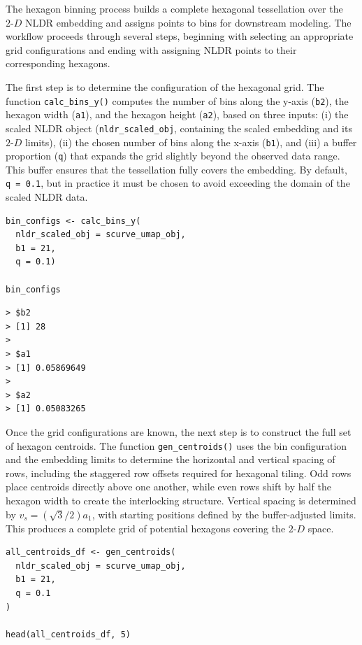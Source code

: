 The hexagon binning process builds a complete hexagonal tessellation over the \(2\text{-}D\) NLDR embedding and assigns points to bins for downstream modeling. The workflow proceeds through several steps, beginning with selecting an appropriate grid configurations and ending with assigning NLDR points to their corresponding hexagons.

The first step is to determine the configuration of the hexagonal grid. The function \texttt{calc\_bins\_y()} computes the number of bins along the y-axis (\texttt{b2}), the hexagon width (\texttt{a1}), and the hexagon height (\texttt{a2}), based on three inputs: (i) the scaled NLDR object (\texttt{nldr\_scaled\_obj}, containing the scaled embedding and its \(2\text{-}D\) limits), (ii) the chosen number of bins along the x-axis (\texttt{b1}), and (iii) a buffer proportion (\texttt{q}) that expands the grid slightly beyond the observed data range. This buffer ensures that the tessellation fully covers the embedding. By default, \texttt{q\ =\ 0.1}, but in practice it must be chosen to avoid exceeding the domain of the scaled NLDR data.

\begin{verbatim}
bin_configs <- calc_bins_y(
  nldr_scaled_obj = scurve_umap_obj, 
  b1 = 21, 
  q = 0.1)

bin_configs
\end{verbatim}

\begin{verbatim}
> $b2
> [1] 28
> 
> $a1
> [1] 0.05869649
> 
> $a2
> [1] 0.05083265
\end{verbatim}

Once the grid configurations are known, the next step is to construct the full set of hexagon centroids. The function \texttt{gen\_centroids()} uses the bin configuration and the embedding limits to determine the horizontal and vertical spacing of rows, including the staggered row offsets required for hexagonal tiling. Odd rows place centroids directly above one another, while even rows shift by half the hexagon width to create the interlocking structure. Vertical spacing is determined by \(v_s = (\sqrt{3}/2) a_1\), with starting positions defined by the buffer-adjusted limits. This produces a complete grid of potential hexagons covering the \(2\text{-}D\) space.

\begin{verbatim}
all_centroids_df <- gen_centroids(
  nldr_scaled_obj = scurve_umap_obj, 
  b1 = 21, 
  q = 0.1
)

head(all_centroids_df, 5)
\end{verbatim}

